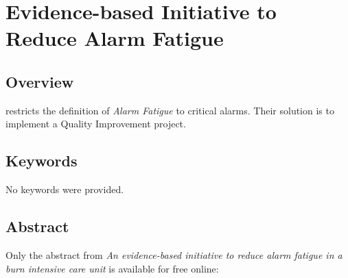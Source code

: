 \chapter{Evidence-based Initiative to Reduce Alarm Fatigue}

\section{Overview}

\citet{gorisek2021evidence} restricts the definition of \textit{Alarm Fatigue} to critical alarms. Their solution is to implement a Quality Improvement project.

\section{Keywords}

No keywords were provided.

\section{Abstract}

Only the abstract from \textit{An evidence-based initiative to reduce alarm fatigue in a burn intensive care unit} is available for free online: \\

